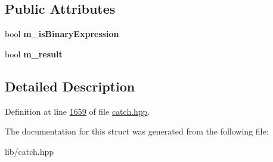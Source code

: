 \subsection*{Public Attributes}
\begin{DoxyCompactItemize}
\item 
\mbox{\label{structCatch_1_1ITransientExpression_a75ce48da824d514d08152d396abb28d8}} 
bool {\bfseries m\+\_\+is\+Binary\+Expression}
\item 
\mbox{\label{structCatch_1_1ITransientExpression_a4646e2b5e0156e913653ec3b9b60c942}} 
bool {\bfseries m\+\_\+result}
\end{DoxyCompactItemize}


\subsection{Detailed Description}


Definition at line \mbox{\hyperlink{catch_8hpp_source_l01659}{1659}} of file \mbox{\hyperlink{catch_8hpp_source}{catch.\+hpp}}.



The documentation for this struct was generated from the following file\+:\begin{DoxyCompactItemize}
\item 
lib/catch.\+hpp\end{DoxyCompactItemize}
